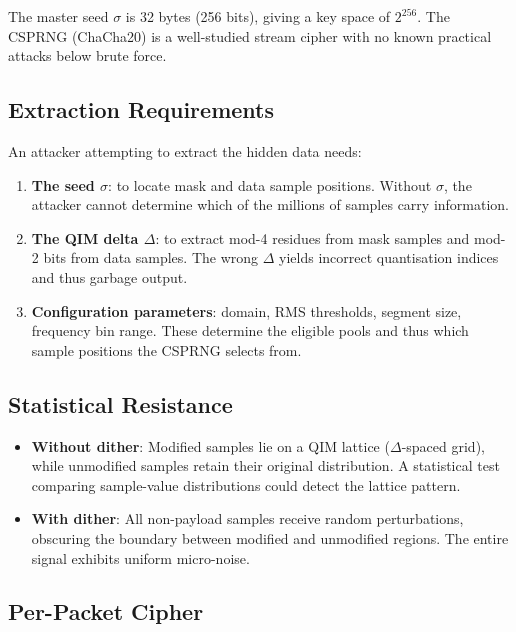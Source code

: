 \documentclass[11pt,a4paper]{article}
\begin{document}
The master seed $\sigma$ is 32 bytes (256 bits), giving a key space of
$2^{256}$.  The CSPRNG (ChaCha20) is a well-studied stream cipher with
no known practical attacks below brute force.

\subsection{Extraction Requirements}

An attacker attempting to extract the hidden data needs:
\begin{enumerate}
    \item \textbf{The seed $\sigma$}: to locate mask and data sample positions.
          Without $\sigma$, the attacker cannot determine which of the millions
          of samples carry information.
    \item \textbf{The QIM delta $\Delta$}: to extract mod-4 residues from mask
          samples and mod-2 bits from data samples.  The wrong $\Delta$ yields
          incorrect quantisation indices and thus garbage output.
    \item \textbf{Configuration parameters}: domain, RMS thresholds, segment
          size, frequency bin range.  These determine the eligible pools and
          thus which sample positions the CSPRNG selects from.
\end{enumerate}

\subsection{Statistical Resistance}

\begin{itemize}
    \item \textbf{Without dither}: Modified samples lie on a QIM lattice
          ($\Delta$-spaced grid), while unmodified samples retain their
          original distribution.  A statistical test comparing sample-value
          distributions could detect the lattice pattern.
    \item \textbf{With dither}: All non-payload samples receive random
          perturbations, obscuring the boundary between modified and
          unmodified regions.  The entire signal exhibits uniform micro-noise.
\end{itemize}

\subsection{Per-Packet Cipher}
\end{document}
